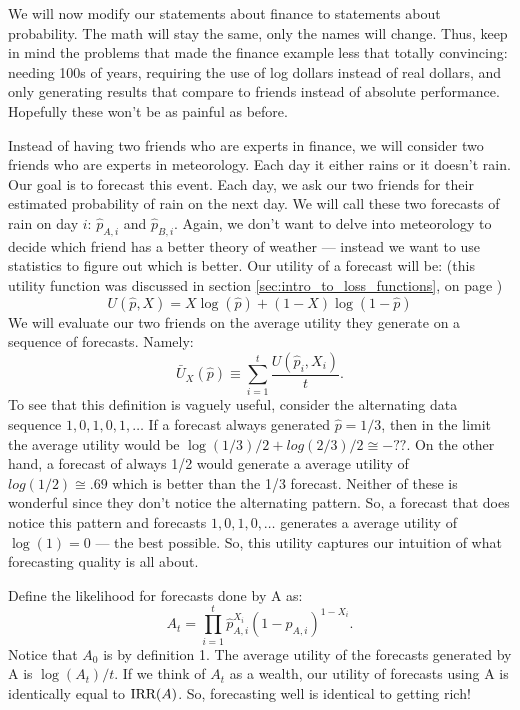\documentclass{book}
\begin{document}
We will now modify our statements about finance to statements about
probability.  The math will stay the same, only the names will change.
Thus, keep in mind the problems that made the finance example less
that totally convincing: needing 100s of years, requiring the use of
log dollars instead of real dollars, and only generating results that
compare to friends instead of absolute performance.  Hopefully these
won't be as painful as before.

 Instead of having two friends who are experts in finance, we will
consider two friends who are experts in meteorology.  Each day it
either rains or it doesn't rain.  Our goal is to forecast this event.
Each day, we ask our two friends for their estimated probability
of rain on the next day.  We will call these two forecasts of rain on
day $i$: $\widehat{p}_{A,i}$ and $\widehat{p}_{B,i}$.  Again, we don't
want to delve into meteorology to decide which friend has a better
theory of weather --- instead we want to use statistics to figure out
which is better.  Our utility of a forecast
will be: (this utility function was discussed in section
\ref{sec:intro_to_loss_functions}, on page 
\pageref{sec:intro_to_loss_functions})
\begin{equation}
  \label{eqn:log_forecasting_utility}
  U(\widehat{p},X) = X \log(\widehat{p}) + (1-X) \log(1-\widehat{p})
\end{equation}
We will evaluate our two friends on the average utility they generate
on a sequence of forecasts.  Namely:
\begin{displaymath}
 \bar{U}_X(\widehat{p})  \equiv \sum_{i=1}^t 
\frac{U(\widehat{p}_i,X_i) }{t}.
\end{displaymath}
To see that this definition is vaguely useful, consider the
alternating data sequence $1,0,1,0,1,\ldots$  If a forecast always
generated $\widehat{p} = 1/3$, then in the limit the average utility
would be $\log(1/3)/2 + log(2/3)/2 \cong - ? ?$. On the other hand, a
forecast of always 1/2 would generate a average utility of $log(1/2)
\cong .69$ which is better than the 1/3 forecast.  Neither of these is
wonderful since they don't notice the alternating pattern.  So, a
forecast that does notice this pattern and forecasts $1,0,1,0,\ldots$
generates a average utility of $\log(1) = 0$ --- the best possible.  So,
this utility captures our intuition of what forecasting quality is all
about.  

Define the likelihood for forecasts done by A as:
 $$A_t = \prod_{i=1}^t \widehat{p}_{A,i}^{X_i}(1 -
 \widehat{p}_{A,i})^{1-X_i}.$$
Notice that $A_0$ is by definition 1.  The average utility of the forecasts
generated by A is $\log(A_t)/t$.  If we think of $A_t$ as a
wealth, our utility of forecasts using A is identically equal to
$\hbox{IRR}(A)$.  So, forecasting well is identical to getting rich!
\end{document}
